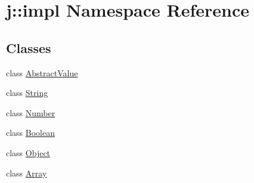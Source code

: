 \hypertarget{namespacej_1_1impl}{\section{j\-:\-:impl Namespace Reference}
\label{namespacej_1_1impl}
}
\subsection*{Classes}
\begin{DoxyCompactItemize}
\item 
class \hyperlink{classj_1_1impl_1_1_abstract_value}{Abstract\-Value}
\item 
class \hyperlink{classj_1_1impl_1_1_string}{String}
\item 
class \hyperlink{classj_1_1impl_1_1_number}{Number}
\item 
class \hyperlink{classj_1_1impl_1_1_boolean}{Boolean}
\item 
class \hyperlink{classj_1_1impl_1_1_object}{Object}
\item 
class \hyperlink{classj_1_1impl_1_1_array}{Array}
\end{DoxyCompactItemize}
